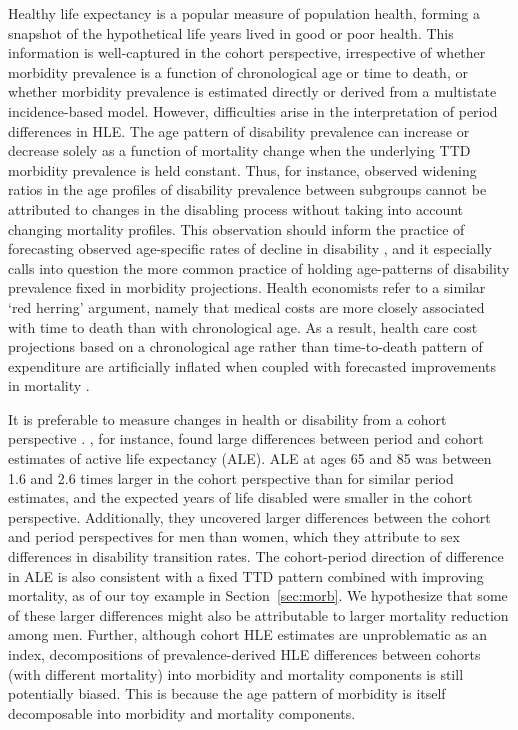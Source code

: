 \documentclass[12pt,oneside,letterpaper,doublespacing]{article}  %
\begin{document}
Healthy life expectancy is a popular measure of population health, forming a snapshot of the hypothetical life years lived in good or poor health. This information is well-captured in the 
cohort perspective, irrespective of whether morbidity prevalence is a function of
chronological age or time to death, or whether morbidity prevalence is estimated directly or derived from a multistate incidence-based model. However, difficulties arise in the
interpretation of period differences in HLE. The age
pattern of disability prevalence can increase or decrease solely as a function of mortality
change when the underlying TTD morbidity prevalence is held constant. Thus, for
instance, observed widening ratios in the age profiles of disability prevalence
between subgroups \citep{Crimmins2001} cannot be attributed to changes in the
disabling process without taking into account changing mortality profiles. This
observation should inform the practice of forecasting observed
age-specific rates of decline in disability \citep{Manton2006,Khaw1999}, and it
especially calls into question the more common practice of holding age-patterns of disability prevalence fixed
in morbidity projections.
Health economists refer to a similar `red herring' argument, namely that medical costs are more closely associated with time to death than with chronological age. As a result, health
care cost projections based on a chronological age rather than time-to-death
pattern of expenditure are artificially inflated when coupled with forecasted improvements in mortality \citep{Zweifel1999,lee2002approach,Geue2014}.

It is preferable to measure changes in health or disability from a cohort perspective \citep{Manton2000,Manton2008,Christensen2013}.
\citet{Manton2000}, for instance, found large differences between period and
cohort estimates of active life expectancy (ALE). ALE at ages 65 and 85 was
between 1.6 and 2.6 times larger in the cohort perspective than for similar
period estimates, and the expected years of life disabled were smaller in the
cohort perspective.
Additionally, they uncovered larger differences between the cohort and period
perspectives for men than women, which they attribute to sex differences in
disability transition rates. The cohort-period direction of difference in ALE is also consistent with a fixed TTD pattern combined with improving mortality, as of our toy example in Section~\ref{sec:morb}. We hypothesize that some of these
larger differences might also be attributable to larger mortality reduction
among men. Further, although cohort HLE estimates are unproblematic as an index,
decompositions of prevalence-derived HLE differences between cohorts (with different mortality) into morbidity and
mortality components is still potentially biased. This is because the age pattern of
morbidity is itself decomposable into morbidity and
mortality components.  
\end{document}
